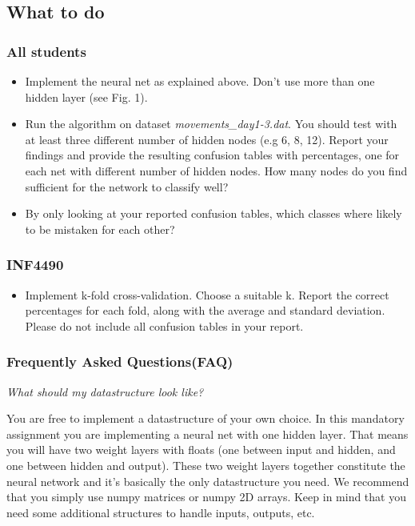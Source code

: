 \subsection*{What to do}

\subsubsection*{All students}
\begin{itemize}
\item Implement the neural net as explained above. Don't use more than one hidden layer (see Fig. 1).
\item Run the algorithm on dataset \emph{movements\_day1-3.dat}. You should test with at least three different number of hidden nodes (e.g 6, 8, 12). Report your findings and provide the resulting confusion tables with percentages, one for each net with different number of hidden nodes. How many nodes do you find sufficient for the network to classify well?
\item By only looking at your reported confusion tables, which classes where likely to be mistaken for each other?
\end{itemize}

\subsubsection*{INF4490}
\begin{itemize}
\item Implement k-fold cross-validation. Choose a suitable k. Report the correct percentages for each fold, along with the average and standard deviation. Please do not include all confusion tables in your report.
\end{itemize}

\subsubsection*{Frequently Asked Questions(FAQ)}
\textit{What should my datastructure look like?}

You are free to implement a datastructure of your own choice.
In this mandatory assignment you are implementing a neural net with one hidden layer.
That means you will have two weight layers with floats
(one between input and hidden, and one between hidden and output).
These two weight layers together constitute the neural network and it’s basically the only datastructure you need.
We recommend that you simply use numpy matrices or numpy 2D arrays.
Keep in mind that you need some additional structures to handle inputs, outputs, etc.\\

